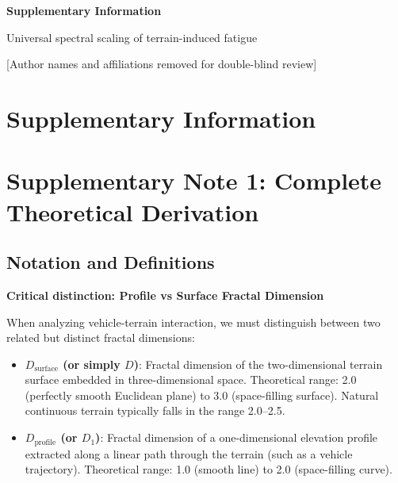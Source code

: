 \documentclass[11pt]{article}
\begin{document}
\begin{center}
{\Large\bfseries Supplementary Information}

\vspace{0.5cm}

{\large Universal spectral scaling of terrain-induced fatigue}

\vspace{0.5cm}

[Author names and affiliations removed for double-blind review]

\end{center}

\vspace{1cm}


\clearpage
\appendix

\section{Supplementary Information}

\section{Supplementary Note 1: Complete Theoretical Derivation}

\subsection{Notation and Definitions}

\textbf{Critical distinction: Profile vs Surface Fractal Dimension}

When analyzing vehicle-terrain interaction, we must distinguish between two related but distinct fractal dimensions:

\begin{itemize}
\item \textbf{$D_{\text{surface}}$ (or simply $D$)}: Fractal dimension of the two-dimensional terrain surface embedded in three-dimensional space. Theoretical range: 2.0 (perfectly smooth Euclidean plane) to 3.0 (space-filling surface). Natural continuous terrain typically falls in the range 2.0--2.5.

\item \textbf{$D_{\text{profile}}$ (or $D_1$)}: Fractal dimension of a one-dimensional elevation profile extracted along a linear path through the terrain (such as a vehicle trajectory). Theoretical range: 1.0 (smooth line) to 2.0 (space-filling curve).
\end{itemize}
\end{document}

